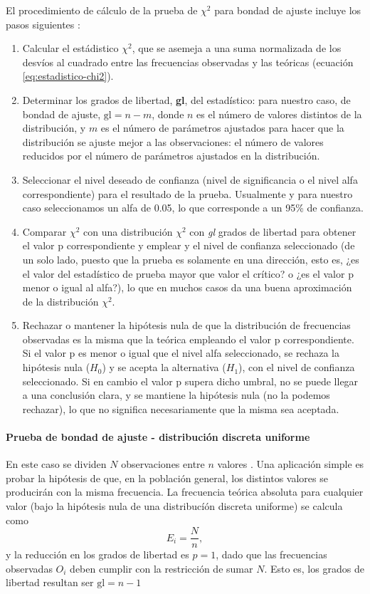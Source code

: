 El procedimiento de cálculo de la prueba de $\chi^{2}$ para bondad de ajuste incluye los pasos siguientes \cite{enwiki2022pearson}:
\begin{enumerate}
  \item Calcular el estádistico $\chi^{2}$, que se asemeja a una suma normalizada de los desvíos al cuadrado entre las frecuencias observadas y las teóricas (ecuación \ref{eq:estadistico-chi2}).
  \item Determinar los grados de libertad, \textbf{gl}, del estadístico: para nuestro caso, de bondad de ajuste, $\text{gl} = n - m$, donde $n$ es el número de valores distintos de la distribución, y $m$ es el número de parámetros ajustados para hacer que la distribución se ajuste mejor a las observaciones: el número de valores reducidos por el número de parámetros ajustados en la distribución.
  \item Seleccionar el nivel deseado de confianza (nivel de significancia o el nivel alfa correspondiente) para el resultado de la prueba. Usualmente y para nuestro caso seleccionamos un alfa de 0.05, lo que corresponde a un 95\% de confianza.
  \item Comparar $\chi^{2}$ con una distribución $\chi^{2}$ con \emph{gl} grados de libertad para obtener el valor p correspondiente y emplear y el nivel de confianza seleccionado (de un solo lado, puesto que la prueba es solamente en una dirección, esto es, ¿es el valor del estadístico de prueba mayor que valor el crítico? o ¿es el valor p menor o igual al alfa?), lo que en muchos casos da una buena aproximación de la distribución $\chi^{2}$.
  \item Rechazar o mantener la hipótesis nula de que la distribución de frecuencias observadas es la misma que la teórica empleando el valor p correspondiente. Si el valor p es menor o igual que el nivel alfa seleccionado, se rechaza la hipótesis nula ($H_{0}$) y se acepta la alternativa ($H_{1}$), con el nivel de confianza seleccionado. Si en cambio el valor p supera dicho umbral, no se puede llegar a una conclusión clara, y se mantiene la hipótesis nula (no la podemos rechazar), lo que no significa necesariamente que la misma sea aceptada.
\end{enumerate}

\paragraph{Prueba de bondad de ajuste - distribución discreta uniforme}
En este caso se dividen $N$ observaciones entre $n$ valores \cite{enwiki2022pearson}. Una aplicación simple es probar la hipótesis de que, en la población general, los distintos valores se producirán con la misma frecuencia. La frecuencia teórica absoluta para cualquier valor (bajo la hipótesis nula de una distribucíón discreta uniforme) se calcula como
\begin{equation*}
  E_i=\frac{N}{n},
\end{equation*}
y la reducción en los grados de libertad es $p=1$, dado que las frecuencias observadas $O_{i}$ deben cumplir con la restricción de sumar $N$. Esto es, los grados de libertad resultan ser $\text{gl} = n - 1$

